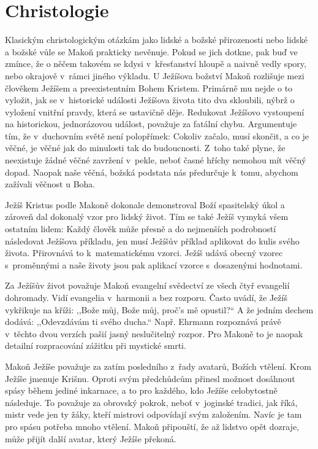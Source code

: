 \section{Christologie}

Klasickým christologickým otázkám jako lidské a božské přirozenosti nebo lidské
a božské vůle se Makoň prakticky nevěnuje. Pokud se jich dotkne, pak buď ve
zmínce, že o něčem takovém se kdysi v~křesťanství hloupě a naivně vedly spory,
nebo okrajově v~rámci jiného výkladu. U Ježíšova božství Makoň rozlišuje mezi
člověkem Ježíšem a preexistentním Bohem Kristem. Primárně mu nejde o to
vyložit, jak se v~historické události Ježíšova života tito dva skloubili, nýbrž
o vyložení vnitřní pravdy, která se ustavičně děje. Redukovat Ježíšovo
vystoupení na historickou, jednorázovou událost, považuje za fatální chybu.
Argumentuje tím, že v~duchovním světě není polopřímek: Cokoliv začalo, musí
skončit, a co je věčné, je věčné jak do minulosti tak do budoucnosti. Z~toho
také plyne, že neexistuje žádné věčné zavržení v~pekle, neboť časné hříchy
nemohou mít věčný dopad. Naopak naše věčná, božská podstata nás předurčuje
k~tomu, abychom zažívali věčnost u Boha.

Ježíš Kristus podle Makoně dokonale demonstroval Boží spasitelský úkol a zároveň
dal dokonalý vzor pro lidský život. Tím se také Ježíš vymyká všem ostatním
lidem: Každý člověk může přesně a do nejmenších podrobností následovat Ježíšova
příkladu, jen musí Ježíšův příklad aplikovat do kulis svého života. Přirovnává
to k~matematickému vzorci. Ježíš udává obecný vzorec s~proměnnými a naše životy
jsou pak aplikací vzorce s~dosazenými hodnotami.

Za Ježíšův život považuje Makoň evangelní svědectví ze všech čtyř evangelií
dohromady. Vidí evangelia v~harmonii a bez rozporu. Často uvádí, že Ježíš
vykřikuje na kříži: ,,Bože můj, Bože můj, proč's mě opustil?`` A že jedním
dechem dodává: ,,Odevzdávám ti svého ducha.`` Např. Ehrmann rozpoznává právě
v~těchto dvou verzích pašií jasný neslučitelný rozpor\cite{ehrman2000new}. Pro
Makoně to je naopak detailní rozpracování zážitku při mystické smrti.

Makoň Ježíše považuje za zatím posledního z~řady avatarů, Božích vtělení. Krom
Ježíše jmenuje Krišnu. Oproti svým předchůdcům přinesl možnost dosáhnout spásy
během jediné inkarnace, a to pro každého, kdo Ježíše celobytostně následuje. To
považuje za obrovský pokrok, neboť v~joginské tradici, jak říká, mistr vede jen
ty žáky, kteří mistrovi odpovídají svým založením. Navíc je tam pro spásu
potřeba mnoho vtělení. Makoň připouští, že až lidstvo opět dozraje, může přijít
další avatar, který Ježíše překoná.

